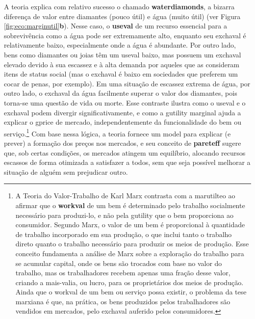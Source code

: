 \documentclass[./main.tex]{subfiles}
\begin{document}
\par A \gls{teoria} explica com relativo sucesso o chamado \textbf{\gls{waterdiamonds}}, a bizarra diferença de valor entre diamantes (pouco útil) e água (muito útil) (ver Figura \ref{fig:eco:marginutil}\textbf{b}).  Nesse caso, o \textbf{\gls{useval}} de um recurso essencial para a sobrevivência como a água pode ser extremamente alto, enquanto seu \gls{exchaval} é relativamente baixo, especialmente onde a água é abundante. Por outro lado, bens como diamantes ou joias têm um \gls{useval} baixo, mas possuem um \gls{exchaval} elevado devido à sua escassez e à alta demanda por aqueles que as consideram itens de status social (mas o \gls{exchaval} é baixo em sociedades que preferem um cocar de penas, por exemplo). Em uma situação de escassez extrema de água, por outro lado, o \gls{exchaval} da água facilmente superar o valor dos diamantes, pois torna-se uma questão de vida ou morte. Esse contraste ilustra como o \gls{useval} e o \gls{exchaval} podem divergir significativamente, e como a \gls{gutility} marginal ajuda a explicar o \gls{gprice} de mercado, independentemente da funcionalidade do bem ou serviço.\footnote{A Teoria do Valor-Trabalho de Karl Marx contrasta com a \gls{marutilteo} ao afirmar que o \textbf{\gls{workval}} de um bem é determinado pelo trabalho socialmente necessário para produzi-lo, e não pela \gls{gutility} que o bem proporciona ao consumidor. Segundo Marx, o valor de um bem é proporcional à quantidade de trabalho incorporado em sua produção, o que inclui tanto o trabalho direto quanto o trabalho necessário para produzir os meios de produção. Esse conceito fundamenta a análise de Marx sobre a exploração do trabalho para se acumular capital, onde os bens são trocados com base no valor do trabalho, mas os trabalhadores recebem apenas uma fração desse valor, criando a mais-valia, ou lucro, para os proprietários dos meios de produção. Ainda que o \gls{workval} de um bem ou serviço possa existir, o problema da tese marxiana é que, na prática, os bens produzidos pelos trabalhadores são vendidos em mercados, pelo \gls{exchaval} auferido pelos consumidores.} Com base nessa lógica, a \gls{teoria} fornece um \gls{model} para explicar (e prever) a formação dos preços nos mercados, e seu conceito de \textbf{\gls{pareteff}} sugere que, sob certas condições, os mercados atingem um equilíbrio, alocando recursos escassos de forma otimizada a satisfazer a todos, sem que seja possível melhorar a situação de alguém sem prejudicar outro.
\end{document}
